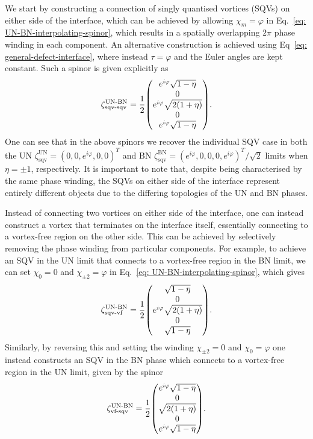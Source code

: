 We start by constructing a connection of singly quantised vortices (SQVs) on
either side of the interface, which can be achieved by allowing
\(\chi_m=\varphi \) in Eq.~\eqref{eq: UN-BN-interpolating-spinor}, which results
in a spatially overlapping \(2\pi \) phase winding in each component.
An alternative construction is achieved using
Eq~\eqref{eq: general-defect-interface}, where instead \(\tau=\varphi \) and the
Euler angles are kept constant.
Such a spinor is given explicitly as
\begin{align}\label{eq: UN-BN-SQV-SQV}
    \zeta_\text{sqv-sqv}^\text{UN-BN} =
    \frac{1}{2}\mqty(
        e^{i\varphi}\sqrt{1-\eta} \\
        0 \\
        e^{i\varphi}\sqrt{2(1+\eta)} \\
        0 \\
        e^{i\varphi}\sqrt{1-\eta}
    ).
\end{align}
One can see that in the above spinors we recover the individual SQV case in both
the UN \(\zeta^\text{UN}_\text{sqv} = {(0,0,e^{i\varphi},0,0)}^T\) and BN
\(\zeta^\mathrm{BN}_\text{sqv} ={(e^{i\varphi},0,0,0,e^{i\varphi})}^T/\sqrt{2}\)
limits when \(\eta = \pm 1\), respectively.
It is important to note that, despite being characterised by the same phase
winding, the SQVs on either side of the interface represent entirely different
objects due to the differing topologies of the UN and BN phases.

Instead of connecting two vortices on either side of the interface, one can
instead construct a vortex that terminates on the interface itself, essentially
connecting to a vortex-free region on the other side.
This can be achieved by selectively removing the phase winding from particular
components.
For example, to achieve an SQV in the UN limit that connects to a vortex-free
region in the BN limit, we can set \(\chi_0 = 0\) and \(\chi_{\pm 2}
= \varphi \) in Eq.~\eqref{eq: UN-BN-interpolating-spinor}, which gives
\begin{align}\label{eq: UN-BN-sqv-vf}
    \zeta^\text{UN-BN}_\text{sqv-vf} = \frac{1}{2}\mqty(
        \sqrt{1-\eta} \\
        0 \\
        e^{i\varphi} \sqrt{2(1+\eta)} \\
        0 \\
        \sqrt{1-\eta}
    ).
\end{align}
Similarly, by reversing this and setting the winding \(\chi_{\pm 2} = 0\) and
\(\chi_0=\varphi \) one instead constructs an SQV in the BN phase which connects
to a vortex-free region in the UN limit, given by the spinor
\begin{align}\label{eq: UN-BN-vf-sqv}
    \zeta^\text{UN-BN}_\text{vf-sqv} = \frac{1}{2}\mqty(
        e^{i\varphi} \sqrt{1-\eta} \\
        0 \\
        \sqrt{2(1+\eta)} \\
        0 \\
        e^{i\varphi} \sqrt{1-\eta}
    ).
\end{align}

